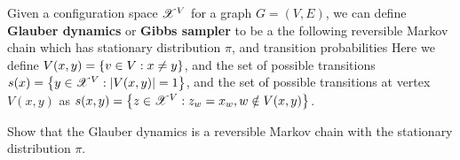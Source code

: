 \documentclass[letterpaper,english,10pt]{article}
\begin{document}
\begin{defn}
Given a configuration space $\mathscr{X}^V$ for a graph $G = (V,E)$, we can define \textbf{Glauber dynamics} or \textbf{Gibbs sampler} to be a the following reversible Markov chain which has stationary distribution $\pi$, 
and transition probabilities 
Here we define $V(x,y) = \left\{v \in V: x \neq y\right\}$, and the set of possible transitions $s(x) = \left\{y \in \mathscr{X}^V: \left\lvert V(x,y)\right\rvert = 1\right\}$, and the set of possible transitions at vertex $V(x,y)$ as  $s(x,y)= \left\{z \in \mathscr{X}^V: z_w = x_w, w \notin V(x,y)\right\}$. 
\end{defn}
\begin{exerc}
Show that the Glauber dynamics is a reversible Markov chain with the stationary distribution $\pi$. 
\end{exerc}
\end{document}
